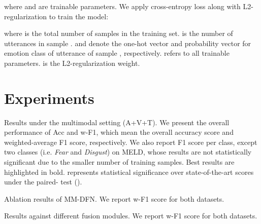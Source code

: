 \documentclass{article}
\begin{document}
where  and  are trainable parameters.
We apply cross-entropy loss  along with L2-regularization to train the model:
    
where  is the total number of samples in the training set.  is the number of utterances in sample .  and  denote the one-hot vector and probability vector for emotion class  of utterance  of sample , respectively.
 refers to  all trainable parameters.  is the L2-regularization weight.





\section{Experiments}


\begin{table*}[t]
  \centering
      \resizebox{1.0\linewidth}{!}{^{*}^{*}^{*}^{*}^{*}^{*}^{*}^{*}^{*}^{*}^{*}^{*}}
  \caption{
  Results under the multimodal setting (A+V+T).
We present the overall performance of Acc and w-F1, which mean the overall accuracy score and weighted-average F1 score, respectively.
  We also report F1 score per class, except two classes (i.e. \textit{Fear} and \textit{Disgust}) on MELD, whose results are not statistically significant due to the smaller number of training samples.
  Best results are highlighted in bold.   represents statistical significance over state-of-the-art scores under the paired- test ().
} \label{tab:result}
\end{table*}











\begin{table}[t]
  \centering
      \resizebox{1.0\linewidth}{!}{}
  \caption{
  Ablation results of MM-DFN. We report w-F1 score for both datasets.
}
\label{tab:abla}
\end{table}


\begin{table}[t]
  \centering
      \resizebox{1.0\linewidth}{!}{}
  \caption{
Results against different fusion modules. We report w-F1 score for both datasets. 
  } \label{tab:fusion}
\end{table}
\end{document}
